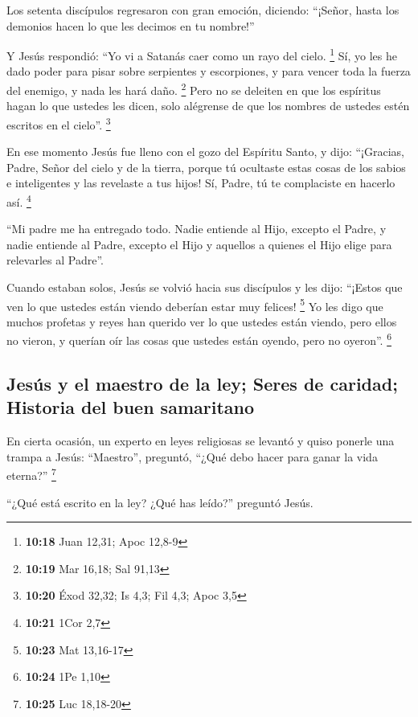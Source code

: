  Los setenta discípulos regresaron con gran emoción,
diciendo: ``¡Señor, hasta los demonios hacen lo que les decimos en tu
nombre!''

 Y Jesús respondió: ``Yo vi a Satanás caer como un rayo
del cielo. \footnote{\textbf{10:18} Juan 12,31; Apoc 12,8-9}
 Sí, yo les he dado poder para pisar sobre serpientes y
escorpiones, y para vencer toda la fuerza del enemigo, y nada les hará
daño. \footnote{\textbf{10:19} Mar 16,18; Sal 91,13} 
Pero no se deleiten en que los espíritus hagan lo que ustedes les dicen,
solo alégrense de que los nombres de ustedes estén escritos en el
cielo''. \footnote{\textbf{10:20} Éxod 32,32; Is 4,3; Fil 4,3; Apoc 3,5}

 En ese momento Jesús fue lleno con el gozo del Espíritu
Santo, y dijo: ``¡Gracias, Padre, Señor del cielo y de la tierra, porque
tú ocultaste estas cosas de los sabios e inteligentes y las revelaste a
tus hijos! Sí, Padre, tú te complaciste en hacerlo así. \footnote{\textbf{10:21}
  1Cor 2,7}

 ``Mi padre me ha entregado todo. Nadie entiende al Hijo,
excepto el Padre, y nadie entiende al Padre, excepto el Hijo y aquellos
a quienes el Hijo elige para relevarles al Padre''.

 Cuando estaban solos, Jesús se volvió hacia sus
discípulos y les dijo: ``¡Estos que ven lo que ustedes están viendo
deberían estar muy felices! \footnote{\textbf{10:23} Mat 13,16-17}
 Yo les digo que muchos profetas y reyes han querido ver
lo que ustedes están viendo, pero ellos no vieron, y querían oír las
cosas que ustedes están oyendo, pero no oyeron''. \footnote{\textbf{10:24}
  1Pe 1,10}

\hypertarget{jesuxfas-y-el-maestro-de-la-ley-seres-de-caridad-historia-del-buen-samaritano}{%
\subsection{Jesús y el maestro de la ley; Seres de caridad; Historia del
buen
samaritano}\label{jesuxfas-y-el-maestro-de-la-ley-seres-de-caridad-historia-del-buen-samaritano}}

 En cierta ocasión, un experto en leyes religiosas se
levantó y quiso ponerle una trampa a Jesús: ``Maestro'', preguntó,
``¿Qué debo hacer para ganar la vida eterna?'' \footnote{\textbf{10:25}
  Luc 18,18-20}

 ``¿Qué está escrito en la ley? ¿Qué has leído?''
preguntó Jesús.

